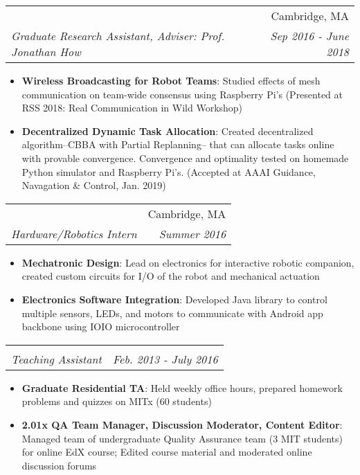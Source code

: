 \documentclass[letterpaper,11pt]{article}
\makeatletter
\newcommand{\resumeItem}[2]{
  \item\small{
    \textbf{#1}{: #2 \vspace{-2pt}}
  }
}
\newcommand{\resumeSubheading}[4]{
  \vspace{-1pt}\item
    \begin{tabular*}{0.97\textwidth}{l@{\extracolsep{\fill}}r}
      \textbf{\color{blue}{#1}} & #2 \\
      \textit{\small#3} & \textit{\small #4} \\
    \end{tabular*}\vspace{-5pt}
}
\newcommand{\resumeItemListStart}{\begin{itemize}}
\newcommand{\resumeItemListEnd}{\end{itemize}\vspace{-5pt}}
\newcommand{\Cambridge}{Cambridge, MA}
\makeatother
\begin{document}
    \resumeSubheading
      {MIT Laboratory for Information \& Decision Systems}{\Cambridge}
      {Graduate Research Assistant, \textit{Adviser: Prof. Jonathan How}}{Sep 2016 - June 2018}
      \resumeItemListStart
        \resumeItem{Wireless Broadcasting for Robot Teams}
          {Studied effects of mesh communication on team-wide consensus using Raspberry Pi's (Presented at RSS 2018:  Real Communication in Wild Workshop)}
        \resumeItem{Decentralized Dynamic Task Allocation}
          {Created decentralized algorithm--CBBA with Partial Replanning-- that can allocate tasks online with provable convergence.  Convergence and optimality tested on homemade Python simulator and Raspberry Pi's.  (Accepted at AAAI Guidance, Navagation \& Control, Jan. 2019)}
      \resumeItemListEnd

    \resumeSubheading
      {Woobo, Inc.}{\Cambridge}
      {Hardware/Robotics Intern}{Summer 2016}
      \resumeItemListStart
        \resumeItem{Mechatronic Design}
          {Lead on electronics for interactive robotic companion, created custom circuits for I/O of the robot and mechanical actuation}
        \resumeItem{Electronics Software Integration}
          {Developed Java library to control multiple sensors, LEDs, and motors to communicate with Android app backbone using IOIO microcontroller}
      \resumeItemListEnd

    \resumeSubheading
      {MIT Department of Mechanical Engineering}{}
      {Teaching Assistant}{Feb. 2013 - July 2016 }
      \resumeItemListStart
        \resumeItem{Graduate Residential TA}
          {Held weekly office hours, prepared homework problems and quizzes on MITx (60 students)}
        \resumeItem{2.01x QA Team Manager, Discussion Moderator, Content Editor}
          {Managed team of undergraduate Quality Assurance team (3 MIT students) for online EdX course; Edited course material and moderated online discussion forums }
      \resumeItemListEnd

      
\end{document}
